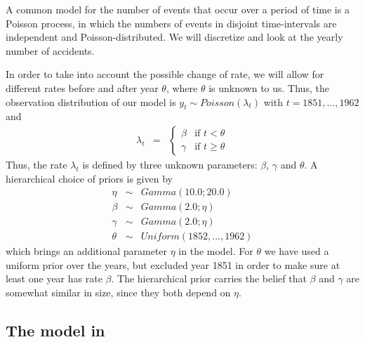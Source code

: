 A common model for the number of events that occur over a period of time is a Poisson process, in which the numbers of events in disjoint time-intervals are independent and Poisson-distributed. 
We will discretize and look at the yearly number of accidents. 

In order to take into account the possible change of rate, we will allow for different rates before and after year $\theta$, where $\theta$ is unknown to us. 
Thus, the observation distribution of our model is 
$y_t \sim Poisson(\lambda_t)$ with $t = 1851,\ldots,1962$ and
\begin{eqnarray*}
\lambda_t & = & \begin{cases}
\beta & \mbox{if } t < \theta \\
\gamma & \mbox{if } t \geq \theta
\end{cases}
\end{eqnarray*}
Thus, the rate $\lambda_t$ is defined by three unknown parameters: $\beta$, $\gamma$ and $\theta$. A hierarchical choice of priors is given by
\begin{eqnarray*}
 \eta & \sim & Gamma(10.0;20.0) \\ 
 \beta & \sim & Gamma(2.0;\eta) \\
 \gamma & \sim &Gamma(2.0;\eta) \\
 \theta & \sim & Uniform(1852,\ldots,1962)
\end{eqnarray*}
which brings an additional parameter $\eta$ in the model. 
For $\theta$ we have used a uniform prior over the years, but excluded year 1851 in order to make sure at least one year has rate $\beta$.
The hierarchical prior carries the belief that $\beta$ and $\gamma$ are somewhat similar in size,
since they both depend on $\eta$. 

\subsection*{The model in \Rev}

